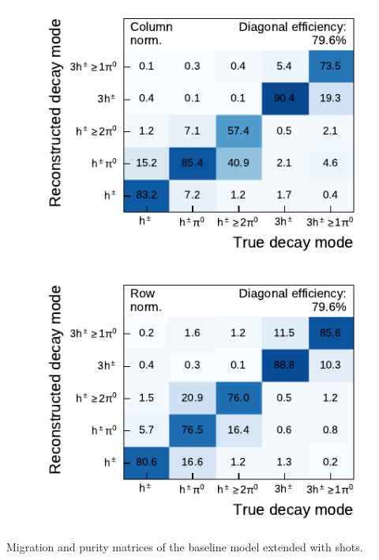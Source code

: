 
\vfill

\noindent
\begin{minipage}{\textwidth}
  \captionsetup{type=figure}
  \begin{subfigure}[t]{0.48\textwidth}
    \centering
    \includegraphics{./figures/decay_mode_classification/experiments/mig_mat_shots.pdf}
  \end{subfigure}\hfill
  \begin{subfigure}[t]{0.48\textwidth}
    \centering
    \includegraphics{./figures/decay_mode_classification/experiments/comp_mat_shots.pdf}
  \end{subfigure}
  \caption{Migration and purity matrices of the baseline model extended with
    shots.}
\end{minipage}

\vfill

